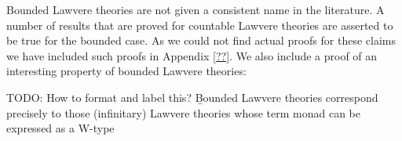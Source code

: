 \documentclass[acmsmall, screen, nonacm]{acmart}
\theoremstyle{definition}
\newcommand{\todo}[1]{{\color{red}TODO: #1}}
\begin{document}
Bounded Lawvere theories are not given a consistent name in the
literature. A number of results that are proved for countable Lawvere
theories are asserted to be true for the bounded case. As we could not
find actual proofs for these claims we have included such proofs in
Appendix \ref{??}. We also include a proof of an interesting property
of bounded Lawvere theories:

\todo{How to format and label this?}  {\b Bounded Lawvere theories
  correspond precisely to those (infinitary) Lawvere theories whose
  term monad can be expressed as a W-type}
\end{document}
